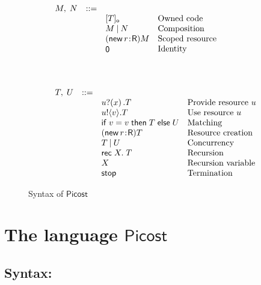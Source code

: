 \documentclass{LMCS}
\newcommand{\pfn}[1]{\mathsf{#1}}  \newcommand{\cfn}[1]{\mathsf{#1}}  \newcommand{\ownfnt}[1]{{\mathsf{#1}}}
\newcommand{\picost}{\ensuremath{\pfn{Picost}}\xspace}
\newcommand{\typeletter}[1]{{\mathsf{#1}}}
\newcommand{\tR}{\typeletter{R}}
\newcommand{\pa}[1]{\!\left(#1\right)}
\newcommand{\pc}[1]{\langle#1\rangle}
\newcommand{\Cassoc}[2]{ {{#1}\kern -0.2em : \kern -0.2em {#2}}}
\newcommand{\Cnew}[2]{(\mathop{\pfn{new}} \Cassoc{#1}{#2})}
\newcommand{\Cnil}{\mathop{\pfn{0}}}
\newcommand{\Cstop}{\mathop{\pfn{stop}}}
\newcommand{\Cpar}{\mathbin{|}}
\newcommand{\Cmatch}[3]{\pfn{if}\; #1 \; \pfn{then}\; #2\;
                        \pfn{else}\; #3}
\newcommand{\Crec}[2]{\pfn{rec}\;#1.\;#2}
\newcommand{\Cloc}[2]{[#1]_{\ownfnt{#2}}}
\begin{document}
\begin{figure}[t]

\begin{align*}
&\begin{array}{lcll}
  M,\;N &::=&                &\textbf{}\\
        &   & \Cloc{T}{o}    &\text{Owned code}\\
        &   &  M \Cpar N     &\text{Composition}\\
        &   &  \Cnew{r}{\tR}M &\text{Scoped resource}\\
        &   &  \Cnil         & \text{Identity}\\\\\\\\
\end{array}
\\
&\begin{array}{lcll}
T,\;U &::=&                   &\\
      &  & u?\pa{x}. T       &\text{Provide resource $u$}\\
      &  & u!\pc{v}. T               &\text{Use resource $u$}\\
      &  & \Cmatch{v=v}{T}{U} &\text{Matching}\\
      &  & \Cnew{r}{\tR} T     &\text{Resource creation}\\    
      &  & T \Cpar U          &\text{Concurrency} \\
      &  & \Crec{X}{T}                &\text{Recursion} \\
      &  & X                &\text{Recursion variable} \\
      &  & \Cstop               &\text{Termination}      \\
\end{array}
\end{align*}
\caption{Syntax of \picost\label{fig:syn}}
\end{figure}



\section{The language \picost}\label{sec:lang}

\subsection{Syntax:}
\end{document}
